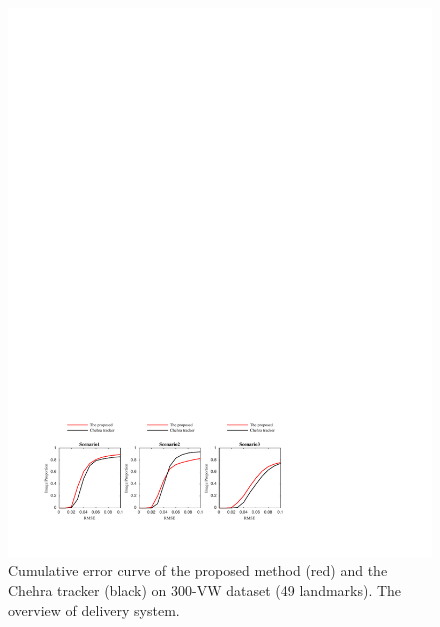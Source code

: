\documentclass[a4paper, 10pt, conference]{ieeeconf}      %
\begin{document}
\begin{figure}[htbp]
        \centering  
        \includegraphics[width=\textwidth,height=0.3\textheight]{Figures_NMSE_img_proportion.pdf}%
        \caption{
        Cumulative error curve of the proposed method (red) and the Chehra tracker (black) on 300-VW dataset (49 landmarks).
        The overview of delivery system.
        }
        \label{fig:nmse1}  


\end{figure}
\end{document}
